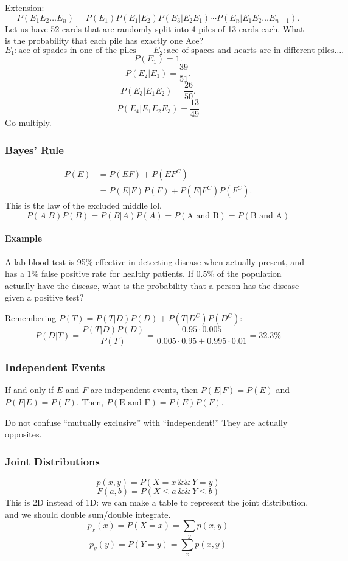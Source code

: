 \documentclass[12pt]{article}
\begin{document}
Extension:
\[P(E_1E_2\dots E_n)=P(E_1)P(E_1|E_2)P(E_3|E_2E_1)\cdots P(E_n|E_1E_2\dots E_{n-1}).\]
Let us have 52 cards that are randomly split into 4 piles of 13 cards each. What is the probability that each pile has exactly one Ace?
\[E_1: \text{ace of spades in one of the piles}\qquad E_2: \text{ace of spaces and hearts are in different piles}\dots.\]
\[P(E_1)=1.\]
\[P(E_2|E_1)=\frac{39}{51}.\]
\[P(E_3|E_1E_2)=\frac{26}{50}.\]
\[P(E_4|E_1E_2E_3)=\frac{13}{49}\]
Go multiply.


\subsubsection{Bayes' Rule}
\begin{align*}P(E)&=P(EF)+P(EF^C) \\
&= P(E|F) P(F) + P(E|F^C) P(F^C).\end{align*}
This is the law of the excluded middle lol.
\[P(A|B)P(B) = P(B|A)P(A) = P(\text{A and B}) = P(\text{B and A})\]

\paragraph{Example} A lab blood test is 95\% effective in detecting disease when actually present, and has a 1\% false positive rate for healthy patients. If 0.5\% of the population actually have the disease, what is the probability that a person has the disease given a positive test?

Remembering $P(T) = P(T|D) P(D) + P(T|D^C) P(D^C)$:
\[P(D|T) = \frac{P(T|D) P(D)}{P(T)} = \frac{0.95 \cdot 0.005}{0.005\cdot0.95 + 0.995 \cdot 0.01} = \boxed{32.3\%}\]

\subsubsection{Independent Events}
If and only if $E$ and $F$ are independent events, then $P(E|F) = P(E)$ and $P(F|E) = P(F)$. Then, $P(\text{E and F}) = P(E) P(F)$.

Do not confuse ``mutually exclusive'' with ``independent!'' They are actually opposites.


\subsubsection{Joint Distributions}
\[p(x,y) = P(X=x\,\&\&\,Y=y)\]
\[F(a,b) = P(X\le a\,\&\&\,Y\le b)\]
This is 2D instead of 1D: we can make a table to represent the joint distribution, and we should double sum/double integrate.
\[p_x(x) = P(X = x) = \sum_y p(x,y)\]
\[p_y(y) = P(Y = y) = \sum_x p(x,y)\]
\end{document}
